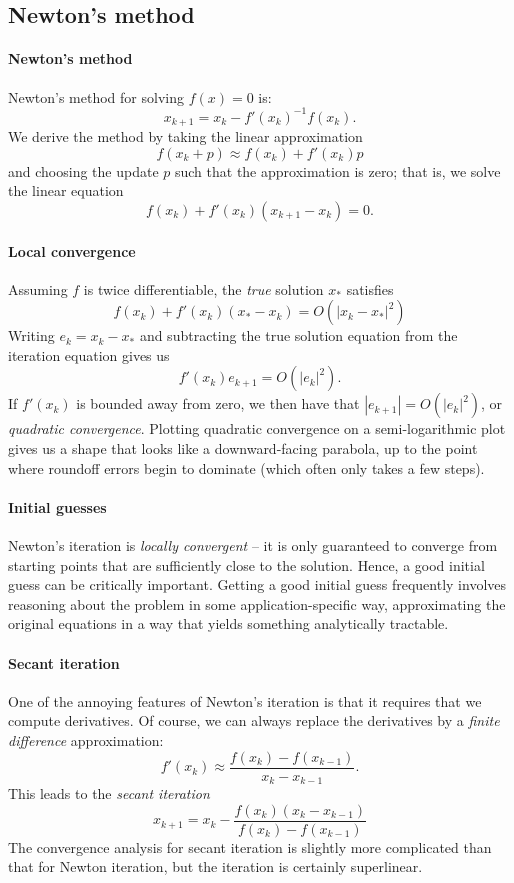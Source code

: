 \documentclass[12pt, leqno]{article}
\begin{document}
\subsection{Newton's method}

\paragraph{Newton's method}
Newton's method for solving $f(x) = 0$ is:
\[
  x_{k+1} = x_k - f'(x_k)^{-1} f(x_k).
\]
We derive the method by taking the linear approximation
\[
  f(x_k + p) \approx f(x_k) + f'(x_k) p
\]
and choosing the update $p$ such that the approximation is zero;
that is, we solve the linear equation
\[
  f(x_k) + f'(x_k) (x_{k+1}-x_k) = 0.
  \]

\paragraph{Local convergence}
Assuming $f$ is twice differentiable, the {\em true} solution $x_*$ satisfies
\[
  f(x_k) + f'(x_k) (x_*-x_k) = O(|x_k-x_*|^2)
\]
Writing $e_k = x_k-x_*$ and subtracting the true solution equation
from the iteration equation gives us
\[
  f'(x_k) e_{k+1} = O(|e_k|^2).
  \]
If $f'(x_k)$ is bounded away from zero, we then have that $|e_{k+1}| =
O(|e_k|^2)$, or {\em quadratic convergence}.  Plotting quadratic
convergence on a semi-logarithmic plot gives us a shape that looks
like a downward-facing parabola, up to the point where roundoff errors
begin to dominate (which often only takes a few steps).

\paragraph{Initial guesses}
Newton's iteration is {\em locally convergent} -- it is only
guaranteed to converge from starting points that are sufficiently
close to the solution.  Hence, a good initial guess can be critically
important.  Getting a good initial guess frequently involves reasoning
about the problem in some application-specific way, approximating the
original equations in a way that yields something analytically
tractable.

\paragraph{Secant iteration}
One of the annoying features of Newton's iteration is that
it requires that we compute derivatives.  Of course, we
can always replace the derivatives by a {\em finite difference}
approximation:
\[
  f'(x_{k}) \approx \frac{f(x_k)-f(x_{k-1})}{x_k-x_{k-1}}.
\]
This leads to the {\em secant iteration}
\[
  x_{k+1} = x_k - \frac{f(x_k)(x_k-x_{k-1})}{f(x_k)-f(x_{k-1})}
\]
The convergence analysis for secant iteration is slightly more
complicated than that for Newton iteration, but the iteration
is certainly superlinear.
\end{document}
